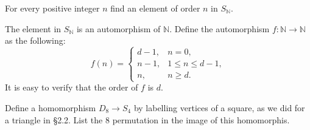 \begin{problem}[2.3]
        For every positive integer $n$ find an element of order $n$ in $S_\mathbb{N}$.
\end{problem}
\begin{solution}
The element in $S_\mathbb{N}$ is an automorphism of $\mathbb{N}$. Define the automorphism $f:\mathbb{N}\to \mathbb{N}$ as the following:
\[
f(n)=
\begin{cases}
d-1, &n=0,\\
n-1, &1\leq n \leq d-1,\\
n, &n \geq d.
\end{cases}
\]
It is easy to verify that the order of $f$ is $d$.
\end{solution}


\begin{problem}[2.4]
Define a homomorphism $D_8\to S_4$ by labelling vertices of a square, as we did for a triangle in \S 2.2. List the 8 permutation in the image
of this homomorphis.
\end{problem}

